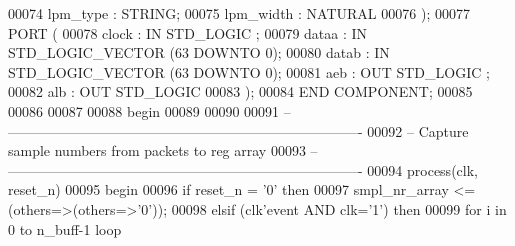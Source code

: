 \begin{DoxyCode}
00074         lpm\_type        : \textcolor{comment}{STRING};
00075         lpm\_width       : \textcolor{comment}{NATURAL}
00076     );
00077     \textcolor{keywordflow}{PORT} (
00078             clock   : \textcolor{keywordflow}{IN} \textcolor{comment}{STD\_LOGIC} ;
00079             dataa   : \textcolor{keywordflow}{IN} \textcolor{comment}{STD\_LOGIC\_VECTOR} (\textcolor{vhdllogic}{}\textcolor{vhdllogic}{63} \textcolor{keywordflow}{DOWNTO} \textcolor{vhdllogic}{}\textcolor{vhdllogic}{0});
00080             datab   : \textcolor{keywordflow}{IN} \textcolor{comment}{STD\_LOGIC\_VECTOR} (\textcolor{vhdllogic}{}\textcolor{vhdllogic}{63} \textcolor{keywordflow}{DOWNTO} \textcolor{vhdllogic}{}\textcolor{vhdllogic}{0});
00081             aeb : \textcolor{keywordflow}{OUT} \textcolor{comment}{STD\_LOGIC} ;
00082             alb : \textcolor{keywordflow}{OUT} \textcolor{comment}{STD\_LOGIC} 
00083     );
00084     \textcolor{keywordflow}{END} \textcolor{keywordflow}{COMPONENT};
00085 
00086 
00087 
00088 \textcolor{vhdlkeyword}{begin}
00089 
00090 
00091 \textcolor{keyword}{-- ----------------------------------------------------------------------------}
00092 \textcolor{keyword}{-- Capture sample numbers from packets to reg array}
00093 \textcolor{keyword}{-- ----------------------------------------------------------------------------}
00094 \textcolor{keywordflow}{process}(clk, reset_n)
00095 \textcolor{vhdlkeyword}{begin}
00096    \textcolor{keywordflow}{if} \textcolor{vhdlchar}{reset_n} \textcolor{vhdlchar}{=} \textcolor{vhdlchar}{'}\textcolor{vhdllogic}{}\textcolor{vhdllogic}{0}\textcolor{vhdlchar}{'} \textcolor{keywordflow}{then} 
00097       \textcolor{vhdlchar}{smpl_nr_array} \textcolor{vhdlchar}{<=} \textcolor{vhdlchar}{(}\textcolor{keywordflow}{others}\textcolor{vhdlchar}{=}\textcolor{vhdlchar}{>}\textcolor{vhdlchar}{(}\textcolor{keywordflow}{others}\textcolor{vhdlchar}{=}\textcolor{vhdlchar}{>}\textcolor{vhdlchar}{'}\textcolor{vhdllogic}{}\textcolor{vhdllogic}{0}\textcolor{vhdlchar}{'}\textcolor{vhdlchar}{)}\textcolor{vhdlchar}{)};
00098    \textcolor{keywordflow}{elsif} \textcolor{vhdlchar}{(}\textcolor{vhdlchar}{clk}\textcolor{vhdlchar}{'}\textcolor{vhdlkeyword}{event} \textcolor{keywordflow}{AND} \textcolor{vhdlchar}{clk}\textcolor{vhdlchar}{=}\textcolor{vhdlchar}{'}\textcolor{vhdllogic}{}\textcolor{vhdllogic}{1}\textcolor{vhdlchar}{'}\textcolor{vhdlchar}{)} \textcolor{keywordflow}{then} 
00099       \textcolor{keywordflow}{for} \textcolor{vhdlchar}{i} \textcolor{keywordflow}{in} \textcolor{vhdllogic}{}\textcolor{vhdllogic}{0} \textcolor{keywordflow}{to} \textcolor{vhdlchar}{n_buff}\textcolor{vhdlchar}{-}\textcolor{vhdllogic}{}\textcolor{vhdllogic}{1} \textcolor{keywordflow}{loop}

\end{DoxyCode}
